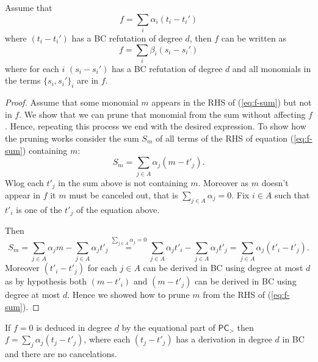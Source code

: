 \documentclass[a4paper,twoside,justified]{tufte-handout}
\begin{document}
 



\begin{lemma}\label{lem:linComb}
Assume that 
\begin{equation}\label{eq:f-sum}
f = \sum_{i} \alpha_i  (t_i-t_i')
\end{equation}
where  $(t_i-t_i')$ has a BC refutation of degree $d$, then $f$ can be written as
\begin{equation*}
f = \sum_{i} \beta_i  (s_i-s_i')
\end{equation*}
where for each $i$ $(s_i-s_i')$ has a BC refutation of degree $d$  and all monomials in the terms $\{s_i,s_i'\}_i$ are in $f$.
\end{lemma}

\begin{proof}
Assume that some monomial $m$ appears in the RHS of (\ref{eq:f-sum}) but not in $f$. We show that we can prune that monomial from the sum without affecting $f$. Hence, repeating this process we end with the desired expression. To show how the pruning works consider the sum $S_m$ of all terms of the RHS of equation (\ref{eq:f-sum}) containing $m$:
\begin{equation*}
S_m = \sum_{j\in A} \alpha_j ( m-t'_j).
\end{equation*}
Wlog each $t'_j$ in the sum above is not containing $m$.
Moreover as $m$ doesn't appear in $f$ it $m$ must be canceled out, that is $\sum_{j\in A} \alpha_j = 0$. Fix $i\in A$ such that $t'_i$ is one of the $t'_j$ of the equation above.
 
 Then
\begin{equation*}
 S_m=\sum_{j\in A} \alpha_j m -\sum_{j\in A} \alpha_j t'_j\stackrel{\sum_{j\in A}\alpha_j=0}{=}\sum_{j\in A}\alpha_j t'_i - \sum_{j\in A} \alpha_j t'_j
 =\sum_{j\in A}\alpha_j (t'_i - t'_j).
\end{equation*}
Moreover $(t'_i-t'_j)$ for each $j\in A$ can be derived in BC using degree at most $d$ as by hypothesis both $(m-t'_i)$ and $(m-t'_j)$ can be derived in BC using degree at most $d$. Hence we showed how to prune $m$ from the RHS of (\ref{eq:f-sum}).
\end{proof}

\begin{corollary}\label{cor:normal-form}
If $f=0$ is deduced in degree $d$ by the equational part of $\mathsf{PC}_>$ then $f=\sum_j \alpha_j (t_j-t'_j)$, where each $(t_j-t'_j)$ has a derivation in degree $d$ in BC and there are no cancelations.
\end{corollary}
\end{document}
